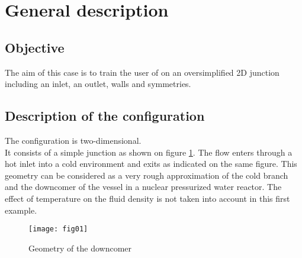 
%
%
%
%


\section{General description}


        \subsection{Objective}
The aim of this case is to train the user of \CS on an oversimplified 2D junction
including an inlet, an outlet, walls and symmetries.

        \subsection{Description of the configuration}

The configuration is two-dimensional.\\
It consists of a simple junction as shown on figure \ref{figante11}.
The flow enters through a hot inlet into a cold
environment and exits as indicated on the same figure. This geometry can be
considered as a very rough approximation of the cold branch and the downcomer of
the vessel in a nuclear pressurized water reactor. The effect of temperature on
the fluid density is not taken into account in this first example.

\begin{figure}[h!]
\begin{center}
\texttt{[image: fig01]}
\caption{Geometry of the downcomer}
\label{figante11}
\end{center}
\end{figure}

